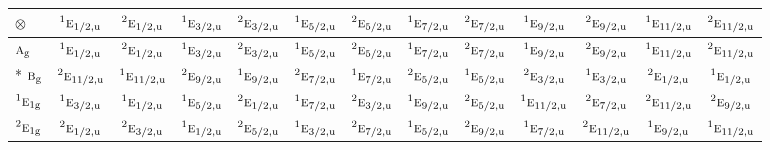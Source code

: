 \documentclass[10pt,a4paper]{article}
\numberwithin{equation}{section}
\newcommand{\irr}[1]{\text{\normalfont\scshape #1}}
\newcommand{\conjpair}[1]{{}^{#1}}
\newcommand{\ptag}[1]{\mathrm{#1}}
\newcommand{\irrprod}{\otimes}
\begin{document}
{\small\setlength{\tabcolsep}{3pt}\begin{longtable}{@{}lcccccccccccc@{}}\toprule
$\irrprod$ & $\conjpair{1}\irr{e}_{1/2,\ptag{u}}$ & $\conjpair{2}\irr{e}_{1/2,\ptag{u}}$ & $\conjpair{1}\irr{e}_{3/2,\ptag{u}}$ & $\conjpair{2}\irr{e}_{3/2,\ptag{u}}$ & $\conjpair{1}\irr{e}_{5/2,\ptag{u}}$ & $\conjpair{2}\irr{e}_{5/2,\ptag{u}}$ & $\conjpair{1}\irr{e}_{7/2,\ptag{u}}$ & $\conjpair{2}\irr{e}_{7/2,\ptag{u}}$ & $\conjpair{1}\irr{e}_{9/2,\ptag{u}}$ & $\conjpair{2}\irr{e}_{9/2,\ptag{u}}$ & $\conjpair{1}\irr{e}_{11/2,\ptag{u}}$ & $\conjpair{2}\irr{e}_{11/2,\ptag{u}}$\\\midrule\endhead
\bottomrule\endfoot\endlastfoot
$\irr{a}_{\ptag{g}}$ & $\conjpair{1}\irr{e}_{1/2,\ptag{u}}$ & $\conjpair{2}\irr{e}_{1/2,\ptag{u}}$ & $\conjpair{1}\irr{e}_{3/2,\ptag{u}}$ & $\conjpair{2}\irr{e}_{3/2,\ptag{u}}$ & $\conjpair{1}\irr{e}_{5/2,\ptag{u}}$ & $\conjpair{2}\irr{e}_{5/2,\ptag{u}}$ & $\conjpair{1}\irr{e}_{7/2,\ptag{u}}$ & $\conjpair{2}\irr{e}_{7/2,\ptag{u}}$ & $\conjpair{1}\irr{e}_{9/2,\ptag{u}}$ & $\conjpair{2}\irr{e}_{9/2,\ptag{u}}$ & $\conjpair{1}\irr{e}_{11/2,\ptag{u}}$ & $\conjpair{2}\irr{e}_{11/2,\ptag{u}}$\\*
$\irr{b}_{\ptag{g}}$ & $\conjpair{2}\irr{e}_{11/2,\ptag{u}}$ & $\conjpair{1}\irr{e}_{11/2,\ptag{u}}$ & $\conjpair{2}\irr{e}_{9/2,\ptag{u}}$ & $\conjpair{1}\irr{e}_{9/2,\ptag{u}}$ & $\conjpair{2}\irr{e}_{7/2,\ptag{u}}$ & $\conjpair{1}\irr{e}_{7/2,\ptag{u}}$ & $\conjpair{2}\irr{e}_{5/2,\ptag{u}}$ & $\conjpair{1}\irr{e}_{5/2,\ptag{u}}$ & $\conjpair{2}\irr{e}_{3/2,\ptag{u}}$ & $\conjpair{1}\irr{e}_{3/2,\ptag{u}}$ & $\conjpair{2}\irr{e}_{1/2,\ptag{u}}$ & $\conjpair{1}\irr{e}_{1/2,\ptag{u}}$\\
$\conjpair{1}\irr{e}_{1\ptag{g}}$ & $\conjpair{1}\irr{e}_{3/2,\ptag{u}}$ & $\conjpair{1}\irr{e}_{1/2,\ptag{u}}$ & $\conjpair{1}\irr{e}_{5/2,\ptag{u}}$ & $\conjpair{2}\irr{e}_{1/2,\ptag{u}}$ & $\conjpair{1}\irr{e}_{7/2,\ptag{u}}$ & $\conjpair{2}\irr{e}_{3/2,\ptag{u}}$ & $\conjpair{1}\irr{e}_{9/2,\ptag{u}}$ & $\conjpair{2}\irr{e}_{5/2,\ptag{u}}$ & $\conjpair{1}\irr{e}_{11/2,\ptag{u}}$ & $\conjpair{2}\irr{e}_{7/2,\ptag{u}}$ & $\conjpair{2}\irr{e}_{11/2,\ptag{u}}$ & $\conjpair{2}\irr{e}_{9/2,\ptag{u}}$\\
$\conjpair{2}\irr{e}_{1\ptag{g}}$ & $\conjpair{2}\irr{e}_{1/2,\ptag{u}}$ & $\conjpair{2}\irr{e}_{3/2,\ptag{u}}$ & $\conjpair{1}\irr{e}_{1/2,\ptag{u}}$ & $\conjpair{2}\irr{e}_{5/2,\ptag{u}}$ & $\conjpair{1}\irr{e}_{3/2,\ptag{u}}$ & $\conjpair{2}\irr{e}_{7/2,\ptag{u}}$ & $\conjpair{1}\irr{e}_{5/2,\ptag{u}}$ & $\conjpair{2}\irr{e}_{9/2,\ptag{u}}$ & $\conjpair{1}\irr{e}_{7/2,\ptag{u}}$ & $\conjpair{2}\irr{e}_{11/2,\ptag{u}}$ & $\conjpair{1}\irr{e}_{9/2,\ptag{u}}$ & $\conjpair{1}\irr{e}_{11/2,\ptag{u}}$\\

\end{longtable}}
\end{document}
